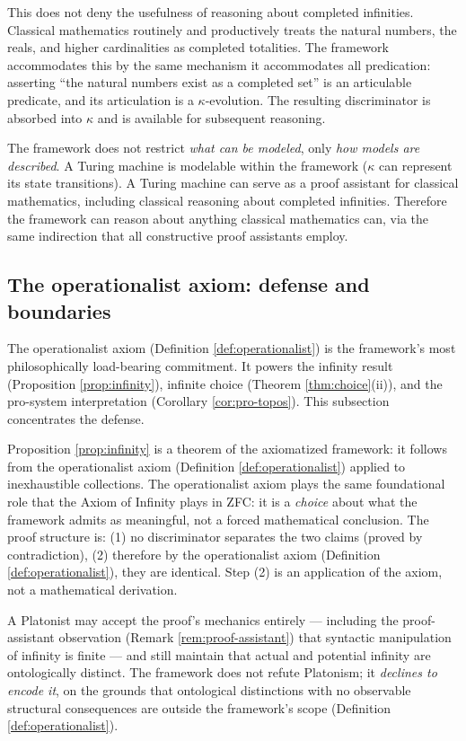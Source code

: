 \begin{remark}
This does not deny the usefulness of reasoning about
completed infinities. Classical mathematics routinely and
productively treats the natural numbers, the reals, and
higher cardinalities as completed totalities. The
framework accommodates this by the same mechanism it
accommodates all predication: asserting ``the natural
numbers exist as a completed set'' is an articulable
predicate, and its articulation is a $\kappa$-evolution.
The resulting discriminator is absorbed into $\kappa$ and
is available for subsequent reasoning.

The framework does not restrict \emph{what can be modeled},
only \emph{how models are described}. A Turing machine is
modelable within the framework ($\kappa$ can represent its
state transitions). A Turing machine can serve as a proof
assistant for classical mathematics, including classical
reasoning about completed infinities. Therefore the
framework can reason about anything classical mathematics
can, via the same indirection that all constructive proof
assistants employ.
\end{remark}

\subsection{The operationalist axiom: defense and boundaries}
\label{sec:operationalist-defense}

The operationalist axiom (Definition \ref{def:operationalist})
is the framework's most philosophically load-bearing
commitment. It powers the infinity result (Proposition
\ref{prop:infinity}), infinite choice (Theorem
\ref{thm:choice}(ii)), and the pro-system interpretation
(Corollary \ref{cor:pro-topos}). This subsection
concentrates the defense.

\begin{remark}
\label{rem:foundational-status}
Proposition \ref{prop:infinity} is a theorem of the
axiomatized framework: it follows from the operationalist
axiom (Definition \ref{def:operationalist}) applied to
inexhaustible collections. The operationalist axiom plays
the same foundational role that the Axiom of Infinity plays
in ZFC: it is a \emph{choice} about what the framework
admits as meaningful, not a forced mathematical conclusion.
The proof structure is: (1) no discriminator separates the
two claims (proved by contradiction), (2) therefore by the
operationalist axiom (Definition \ref{def:operationalist}), they are identical. Step (2) is an
application of the axiom, not a mathematical derivation.

A Platonist may accept the proof's mechanics entirely ---
including the proof-assistant observation (Remark
\ref{rem:proof-assistant}) that syntactic manipulation of
infinity is finite --- and still maintain that actual and
potential infinity are ontologically distinct. The framework
does not refute Platonism; it \emph{declines to encode it},
on the grounds that ontological distinctions with no
observable structural consequences are outside the
framework's scope (Definition \ref{def:operationalist}).
\end{remark}

